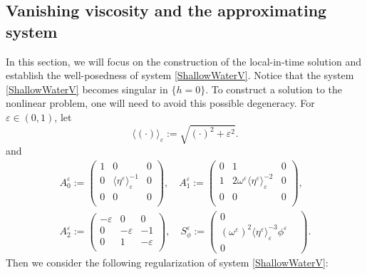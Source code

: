 \documentclass[reqno,11pt]{amsart}
\theoremstyle{plain}
\theoremstyle{definition}
\numberwithin{equation}{section}
\begin{document}
\subsection{Vanishing viscosity and the approximating system}

In this section, we will focus on the construction of the local-in-time solution and establish the well-posedness of system \eqref{ShallowWaterV}. Notice that the system \eqref{ShallowWaterV} becomes singular in $ \lbrace h = 0 \rbrace $. To construct a solution to the nonlinear problem, one will need to avoid this possible degeneracy. 
For $ \varepsilon \in (0,1) $, let 
\begin{equation}
\label{def:jpn-bracket}
\langle (\cdot)\rangle_{\varepsilon}:=\sqrt{(\cdot)^2+\varepsilon^2}.
\end{equation}
and 
\begin{equation}\label{vsc-As}\begin{gathered}
A_0^{\varepsilon}:=\begin{pmatrix}
1 & 0 & 0 \\
0 & \langle \eta^\varepsilon\rangle_{\varepsilon}^{-1} & 0 \\
0 & 0 & 0\\
\end{pmatrix}, \quad 
A_1^{\varepsilon}:=
\begin{pmatrix}
    0 & 1 & 0 \\
    1 & 2\omega^\varepsilon\langle \eta^\varepsilon\rangle_{\varepsilon}^{-2} & 0 \\
    0 & 0 & 0 \\
\end{pmatrix},
\\
A_2^{\varepsilon}:=\begin{pmatrix}
        -\varepsilon & 0 & 0 \\
        0 & -\varepsilon & -1 \\
        0 & 1 & -\varepsilon \\
    \end{pmatrix},
    \quad
    S_{\phi}^{\varepsilon}:=
    \begin{pmatrix}
        0 & \\
        (\omega^\varepsilon)^2 \langle \eta^\varepsilon\rangle_{\varepsilon}^{-3}\phi^\varepsilon\\
        0
    \end{pmatrix}.
\end{gathered}
\end{equation}
Then we consider the following regularization of system \eqref{ShallowWaterV}:
\end{document}
